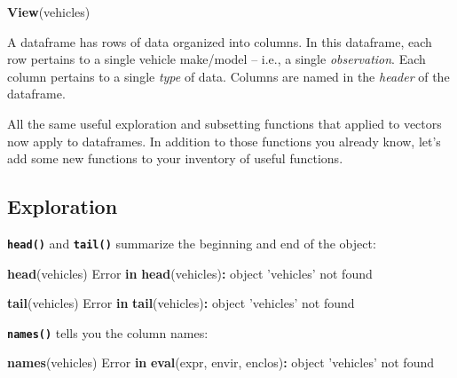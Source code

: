 \documentclass[]{book}
\newenvironment{Shaded}{\begin{snugshade}}{\end{snugshade}}
\newcommand{\ControlFlowTok}[1]{\textcolor[rgb]{0.13,0.29,0.53}{\textbf{#1}}}
\newcommand{\KeywordTok}[1]{\textcolor[rgb]{0.13,0.29,0.53}{\textbf{#1}}}
\newcommand{\NormalTok}[1]{#1}
\newcommand{\OperatorTok}[1]{\textcolor[rgb]{0.81,0.36,0.00}{\textbf{#1}}}
\newcommand{\StringTok}[1]{\textcolor[rgb]{0.31,0.60,0.02}{#1}}
\begin{document}
\begin{Shaded}
\begin{Highlighting}[]
\KeywordTok{View}\NormalTok{(vehicles)}
\end{Highlighting}
\end{Shaded}

A dataframe has rows of data organized into columns. In this dataframe, each row pertains to a single vehicle make/model -- i.e., a single \emph{observation}. Each column pertains to a single \emph{type} of data. Columns are named in the \emph{header} of the dataframe.

All the same useful exploration and subsetting functions that applied to vectors now apply to dataframes. In addition to those functions you already know, let's add some new functions to your inventory of useful functions.

\hypertarget{exploration}{%
\subsection*{Exploration}\label{exploration}}

\textbf{\texttt{head()}} and \textbf{\texttt{tail()}} summarize the beginning and end of the object:

\begin{Shaded}
\begin{Highlighting}[]
\KeywordTok{head}\NormalTok{(vehicles) }
\NormalTok{Error }\ControlFlowTok{in} \KeywordTok{head}\NormalTok{(vehicles)}\OperatorTok{:}\StringTok{ }\NormalTok{object }\StringTok{'vehicles'}\NormalTok{ not found}

\KeywordTok{tail}\NormalTok{(vehicles) }
\NormalTok{Error }\ControlFlowTok{in} \KeywordTok{tail}\NormalTok{(vehicles)}\OperatorTok{:}\StringTok{ }\NormalTok{object }\StringTok{'vehicles'}\NormalTok{ not found}
\end{Highlighting}
\end{Shaded}

\textbf{\texttt{names()}} tells you the column names:

\begin{Shaded}
\begin{Highlighting}[]
\KeywordTok{names}\NormalTok{(vehicles) }
\NormalTok{Error }\ControlFlowTok{in} \KeywordTok{eval}\NormalTok{(expr, envir, enclos)}\OperatorTok{:}\StringTok{ }\NormalTok{object }\StringTok{'vehicles'}\NormalTok{ not found}
\end{Highlighting}
\end{Shaded}
\end{document}
